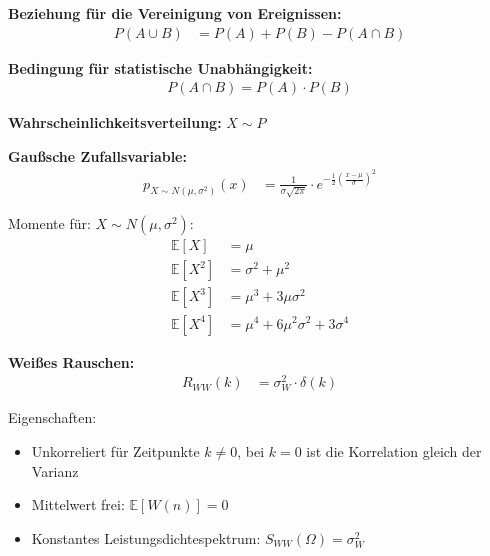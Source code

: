 \textbf{Beziehung für die Vereinigung von Ereignissen:}
\begin{align}
P(A \cup B) &= P(A) + P(B) - P(A \cap B)
\end{align}

\textbf{Bedingung für statistische Unabhängigkeit:}
\begin{align}
P(A \cap B) = P(A) \cdot P(B)
\end{align}

\textbf{Wahrscheinlichkeitsverteilung:}
$X \sim P$

\textbf{Gaußsche Zufallsvariable:}
\begin{align}
p_{X \sim N(\mu,\sigma^2)}(x) &= \frac{1}{\sigma\sqrt{2\pi}} \cdot e^{-\frac{1}{2}\left(\frac{x-\mu}{\sigma}\right)^2}
\end{align}

Momente für: $X \sim N(\mu,\sigma^2)$:
\begin{align}
\mathbb{E}[X] &= \mu\\
\mathbb{E}[X^2] &= \sigma^2 + \mu^2\\
\mathbb{E}[X^3] &= \mu^3 + 3\mu\sigma^2\\
\mathbb{E}[X^4] &= \mu^4 + 6\mu^2\sigma^2 + 3\sigma^4
\end{align}

\textbf{Weißes Rauschen:}
\begin{align}
R_{WW}(k) &= \sigma_W^2 \cdot \delta(k)
\end{align}

Eigenschaften:
\begin{itemize}
\item Unkorreliert für Zeitpunkte $k \neq 0$, bei $k = 0$ ist die Korrelation gleich der Varianz
\item Mittelwert frei: $\mathbb{E}[W(n)] = 0$
\item Konstantes Leistungsdichtespektrum: $S_{WW}(\Omega) = \sigma_W^2$

\end{itemize}
